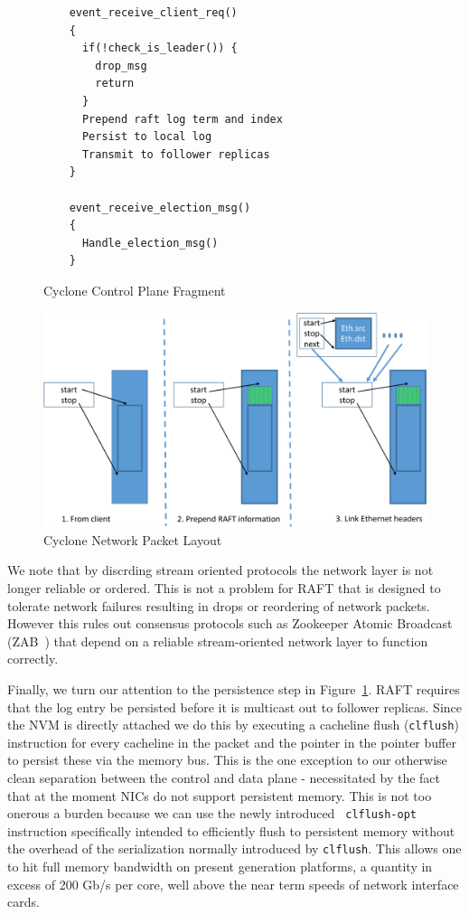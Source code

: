 \documentclass[10pt, preprint, nonatbib]{sigplanconf}
\begin{document}
\begin{figure}
\begin{verbatim}
    event_receive_client_req()
    {
      if(!check_is_leader()) {
        drop_msg
        return
      }
      Prepend raft log term and index
      Persist to local log
      Transmit to follower replicas
    }

    event_receive_election_msg()
    {
      Handle_election_msg()
    }
\end{verbatim}
\caption{Cyclone Control Plane Fragment}
\label{fig:control_plane}
\end{figure}

\begin{figure}
  \centering
  \includegraphics[scale=0.3]{figures2/network_packet.pdf}
  \caption{Cyclone Network Packet Layout}
  \label{fig:packet_layout}
\end{figure}

We note that by discrding stream oriented protocols the network layer is not
longer reliable or ordered. This is not a problem for RAFT that is designed to
tolerate network failures resulting in drops or reordering of network
packets. However this rules out consensus protocols such as Zookeeper Atomic
Broadcast (ZAB~\cite{zab}) that depend on a reliable stream-oriented network
layer to function correctly.

Finally, we turn our attention to the persistence step in
Figure~\ref{fig:control_plane}. RAFT requires that the log entry be persisted
before it is multicast out to follower replicas. Since the NVM is directly
attached we do this by executing a cacheline flush ({\tt clflush}) instruction
for every cacheline in the packet and the pointer in the pointer buffer to
persist these via the memory bus. This is the one exception to our otherwise
clean separation between the control and data plane - necessitated by the fact
that at the moment NICs do not support persistent memory. This is not too
onerous a burden because we can use the newly introduced {\tt
  clflush-opt}~\cite{clflush_opt} instruction specifically intended to
efficiently flush to persistent memory without the overhead of the serialization
normally introduced by {\tt clflush}. This allows one to hit full memory
bandwidth on present generation platforms, a quantity in excess of 200 Gb/s per
core, well above the near term speeds of network interface cards.
\end{document}
